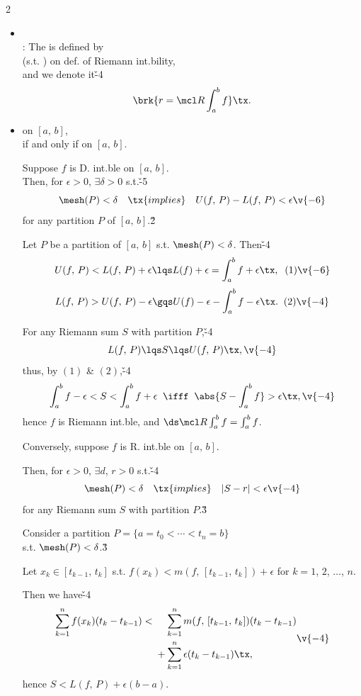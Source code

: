 \documentclass[dvipdfmx,a4paper,titlepage,9pt]{jsarticle}
\begin{document}
\begin{multicols*}{2}
\begin{itemize}[label={-}]
\item{}\\
: The  is defined by\\
\;\; (s.t. ) on def. of Riemann int.bility,\\
\;\;and we denote it\v{-4}
$$\brk{r=\mcl R\int_a^bf}\tx.$$

\item {} on $[a,\,b]$,\\
if and only if  on $[a,\,b]$.

\begin{Pfbox}[($\Longfrom$)]
\rnc{\qedsymbol}{\Sq}
Suppose $f$ is D. int.ble on $[a,\,b]$.\\
Then, for $\epsilon>0$, $\exists\delta>0$ s.t.\v{-5}
$$\mesh(P)<\delta\quad\tx{implies}\quad U(f,\,P)-L(f,\,P)<\epsilon\v{-6}$$
for any partition $P$ of $[a,\,b]$.\v2

Let $P$ be a partition of $[a,\,b]$ s.t. $\mesh(P)<\delta$. Then\v{-4}
$$U(f,\,P)<L(f,\,P)+\epsilon\lqs L(f)+\epsilon=\int_a^bf +\epsilon\tx,\;\;(1)\v{-6}$$
$$L(f,\,P)>U(f,\,P)-\epsilon\gqs U(f)-\epsilon-\int_a^bf-\epsilon\tx.\;\;(2)\v{-4}$$

For any Riemann sum $S$ with partition $P$,\v{-4}
$$L(f,\,P)\lqs S\lqs U(f,\,P)\tx,\v{-4}$$
thus, by $(1)$ \& $(2)$,\v{-4}
$$\int_a^b f-\epsilon<S<\int_a^bf+\epsilon\;\;\ifff\;\;\abs{S-\int_a^bf}>\epsilon\tx,\v{-4}$$
hence $f$ is Riemann int.ble, and $\ds\mcl R\int_a^bf=\int_a^bf$.
\end{Pfbox}

\vfill\null\columnbreak

\begin{Pfbox}[($\Longto$)]
Conversely, suppose $f$ is R. int.ble on $[a,\,b]$.

Then, for $\epsilon>0$, $\exists d$, $r>0$ s.t.\v{-4}
$$\mesh(P)<\delta\quad\tx{implies}\quad|S-r|<\epsilon\v{-4}$$
for any Riemann sum $S$ with partition $P$.\v3

Consider a partition $P=\{a=t_0<\cdots<t_n=b\}$ \\
s.t. $\mesh(P)<\delta$.\v3

Let $x_k\in[t_{k-1},\,t_k]$ s.t. $f(x_k)<m(f,\,[t_{k-1},\,t_k])+\epsilon$ for $k=1$, $2$, $\ldots$, $n$.

Then we have\v{-4}
$$\begin{aligned}\sum_{k=1}^nf(x_k)(t_k-t_{k-1})<{}&
\phantom{{}+{}}\!\sum_{k=1}^nm(f,\,[t_{k-1},\,t_k])(t_k-t_{k-1})\\
&+\sum_{k=1}^n\epsilon(t_k-t_{k-1})\tx,
\end{aligned}\v{-4}$$
hence $S<L(f,\,P)+\epsilon(b-a)$.


\end{Pfbox}
\end{itemize}
\end{multicols*}
\end{document}
